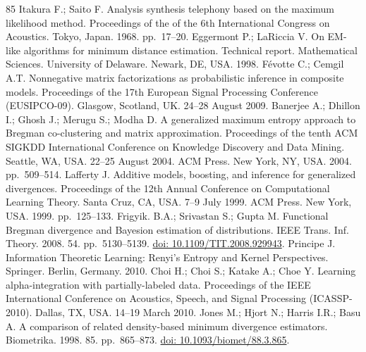 \begin{thebibliography}{85}
\hypertarget{B77-entropy-12-01532}{} Itakura F.; Saito F. Analysis synthesis telephony based on the maximum likelihood method. Proceedings of the of the 6th International Congress on Acoustics. Tokyo, Japan. 1968. pp.~17--20.
\hypertarget{B78-entropy-12-01532}{} Eggermont P.; LaRiccia V. On EM-like algorithms for minimum distance estimation. Technical report. Mathematical Sciences. University of Delaware. Newark, DE, USA. 1998.
\hypertarget{B79-entropy-12-01532}{} Févotte C.; Cemgil A.T. Nonnegative matrix factorizations as probabilistic inference in composite models. Proceedings of the 17th European Signal Processing Conference (EUSIPCO-09). Glasgow, Scotland, UK. 24–28 August 2009.
\hypertarget{B80-entropy-12-01532}{} Banerjee A.; Dhillon I.; Ghosh J.; Merugu S.; Modha D. A generalized maximum entropy approach to Bregman co-clustering and matrix approximation. Proceedings of the tenth ACM SIGKDD International Conference on Knowledge Discovery and Data Mining. Seattle, WA, USA. 22–25 August 2004. ACM Press. New York, NY, USA. 2004. pp.~509--514.
\hypertarget{B81-entropy-12-01532}{} Lafferty J. Additive models, boosting, and inference for generalized divergences. Proceedings of the 12th Annual Conference on Computational Learning Theory. Santa Cruz, CA, USA. 7–9 July 1999. ACM Press. New York, USA. 1999. pp.~125--133.
\hypertarget{B82-entropy-12-01532}{} Frigyik. B.A.; Srivastan S.; Gupta M. Functional Bregman divergence and Bayesion estimation of distributions. IEEE Trans. Inf. Theory. 2008. 54. pp.~5130--5139. \href{https://doi.org/10.1109/TIT.2008.929943}{doi: 10.1109/TIT.2008.929943}.
\hypertarget{B83-entropy-12-01532}{} Principe J. Information Theoretic Learning: Renyi’s Entropy and Kernel Perspectives. Springer. Berlin, Germany. 2010.
\hypertarget{B84-entropy-12-01532}{} Choi H.; Choi S.; Katake A.; Choe Y. Learning alpha-integration with partially-labeled data. Proceedings of the IEEE International Conference on Acoustics, Speech, and Signal Processing (ICASSP-2010). Dallas, TX, USA. 14–19 March 2010.
\hypertarget{B85-entropy-12-01532}{} Jones M.; Hjort N.; Harris I.R.; Basu A. A comparison of related density-based minimum divergence estimators. Biometrika. 1998. 85. pp.~865--873. \href{https://doi.org/10.1093/biomet/88.3.865}{doi: 10.1093/biomet/88.3.865}.
\end{thebibliography}
